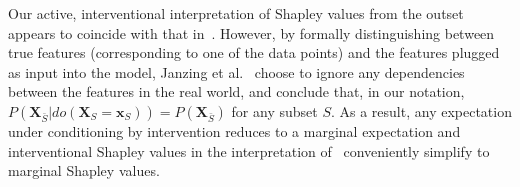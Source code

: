 \documentclass{article}
\newcommand{\vX}{\mathbf{X}}
\newcommand{\vx}{\mathbf{x}}
\newcommand{\expectation}{\mathbb{E}}
\newcommand{\dodo}{\mathit{do}}
\newcommand{\lvdo}[1]{\dodo(\vX_{#1} = \vx_{#1})}
\begin{document}
Our active, interventional interpretation of Shapley values from the outset appears to coincide with that in~\cite{datta2016algorithmic,janzing2019feature,lundberg2020local}. However, by formally distinguishing between true features (corresponding to one of the data points) and the features plugged as input into the model, Janzing et al.~\cite{janzing2019feature} choose to ignore any dependencies between the features in the real world, and conclude that, in our notation, $P(\vX_{\bar{S}}|\lvdo{S}) = P(\vX_{\bar{S}})$ for any subset $S$. As a result, any expectation under conditioning by intervention reduces to a marginal expectation and interventional Shapley values in the interpretation of~\cite{datta2016algorithmic,janzing2019feature,lundberg2020local} conveniently simplify to marginal Shapley values.



\end{document}
